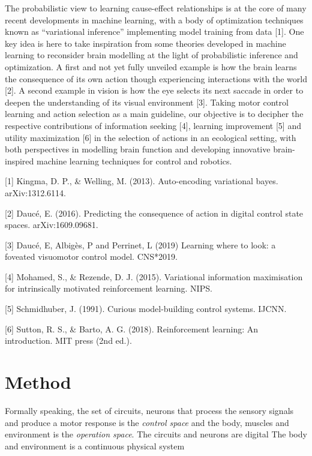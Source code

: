 \documentclass[runningheads]{llncs}
\begin{document}
The probabilistic view to learning cause-effect relationships is at the core of many recent developments in machine learning, with a body of optimization techniques known as “variational inference” implementing model training from data [1]. One key idea is here to take inspiration from some theories developed in machine learning to reconsider brain modelling at the light of probabilistic inference and optimization.
A first and not  yet fully unveiled example is how the brain learns the consequence of its own action though experiencing interactions with the world [2]. A second example in vision is how the eye selects its next saccade in order to deepen the understanding of its visual environment [3].
Taking motor control learning and action selection as a main guideline, our objective is to decipher the respective contributions of information seeking [4], learning improvement [5] and utility maximization [6] in the selection of actions in an ecological setting, with both perspectives in modelling brain function and developing innovative brain-inspired machine learning techniques for control and robotics.

[1] Kingma, D. P., \& Welling, M. (2013). Auto-encoding variational bayes. arXiv:1312.6114.

[2] Daucé, E. (2016). Predicting the consequence of action in digital control state spaces. arXiv:1609.09681.

[3] Daucé, E, Albigès, P and Perrinet, L (2019) Learning where to look: a foveated visuomotor control model. CNS*2019.

[4] Mohamed, S., \& Rezende, D. J. (2015). Variational information maximisation for intrinsically motivated reinforcement learning. NIPS.

[5] Schmidhuber, J. (1991). Curious model-building control systems. IJCNN.

[6] Sutton, R. S., \& Barto, A. G. (2018). Reinforcement learning: An introduction. MIT press (2nd ed.).

\section{Method}

Formally speaking, the set of circuits, neurons that process the sensory signals and produce a motor response
is the \emph{control space} and the body, muscles and environment is the \emph{operation space}. 
The circuits and neurons are digital
The body and environment is a continuous physical system 
\end{document}
